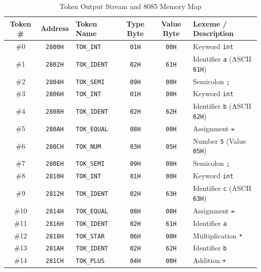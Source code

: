 \documentclass[11pt,a4paper]{article}
\begin{document}
\begin{table}[H]
\centering
\small
\caption{Token Output Stream and 8085 Memory Map}
\label{tab:trace}
\begin{tabularx}{\textwidth}{|c|c|l|c|c|X|}
\hline
\rowcolor[gray]{0.92}
\textbf{Token \#} & \textbf{Address} & \textbf{Token Name} & \textbf{Type Byte} & \textbf{Value Byte} & \textbf{Lexeme / Description} \\
\hline
\#0  & \texttt{2800H} & \texttt{TOK\_INT}   & \texttt{01H} & \texttt{00H} & Keyword \texttt{int} \\
\hline
\#1  & \texttt{2802H} & \texttt{TOK\_IDENT} & \texttt{02H} & \texttt{61H} & Identifier \texttt{a} (ASCII \texttt{61H}) \\
\hline
\#2  & \texttt{2804H} & \texttt{TOK\_SEMI}  & \texttt{09H} & \texttt{00H} & Semicolon \texttt{;} \\
\hline
\#3  & \texttt{2806H} & \texttt{TOK\_INT}   & \texttt{01H} & \texttt{00H} & Keyword \texttt{int} \\
\hline
\#4  & \texttt{2808H} & \texttt{TOK\_IDENT} & \texttt{02H} & \texttt{62H} & Identifier \texttt{b} (ASCII \texttt{62H}) \\
\hline
\#5  & \texttt{280AH} & \texttt{TOK\_EQUAL} & \texttt{08H} & \texttt{00H} & Assignment \texttt{=} \\
\hline
\#6  & \texttt{280CH} & \texttt{TOK\_NUM}   & \texttt{03H} & \texttt{05H} & Number \texttt{5} (Value \texttt{05H}) \\
\hline
\#7  & \texttt{280EH} & \texttt{TOK\_SEMI}  & \texttt{09H} & \texttt{00H} & Semicolon \texttt{;} \\
\hline
\#8  & \texttt{2810H} & \texttt{TOK\_INT}   & \texttt{01H} & \texttt{00H} & Keyword \texttt{int} \\
\hline
\#9  & \texttt{2812H} & \texttt{TOK\_IDENT} & \texttt{02H} & \texttt{63H} & Identifier \texttt{c} (ASCII \texttt{63H}) \\
\hline
\#10 & \texttt{2814H} & \texttt{TOK\_EQUAL} & \texttt{08H} & \texttt{00H} & Assignment \texttt{=} \\
\hline
\#11 & \texttt{2816H} & \texttt{TOK\_IDENT} & \texttt{02H} & \texttt{61H} & Identifier \texttt{a} \\
\hline
\#12 & \texttt{2818H} & \texttt{TOK\_STAR}  & \texttt{06H} & \texttt{00H} & Multiplication \texttt{*} \\
\hline
\#13 & \texttt{281AH} & \texttt{TOK\_IDENT} & \texttt{02H} & \texttt{62H} & Identifier \texttt{b} \\
\hline
\#14 & \texttt{281CH} & \texttt{TOK\_PLUS}  & \texttt{04H} & \texttt{00H} & Addition \texttt{+} \\

\end{tabularx}
\end{table}
\end{document}
